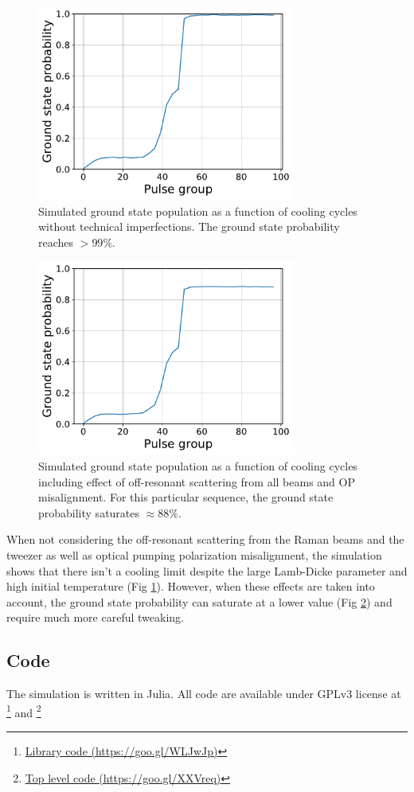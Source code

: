 \documentclass[aps,twocolumn,secnumarabic,balancelastpage,amsmath,amssymb]{revtex4}
\begin{document}
\begin{figure}
  \includegraphics[width=8.5cm]{imgs/simcool_no_scatter.pdf}
  \caption{Simulated ground state population as a function of cooling cycles without
    technical imperfections. The ground state probability reaches $>99\%$. \label{f-no-scatter}}
\end{figure}

\begin{figure}
  \includegraphics[width=8.5cm]{imgs/simcool_real.pdf}
  \caption{Simulated ground state population as a function of cooling cycles including effect of
    off-resonant scattering from all beams and OP misalignment.
    For this particular sequence, the ground state probability saturates $\approx88\%$.
    \label{f-real}}
\end{figure}

When not considering the off-resonant scattering from the Raman beams and the tweezer as well
as optical pumping polarization misalignment, the simulation shows that there isn't a cooling
limit despite the large Lamb-Dicke parameter and high initial temperature (Fig \ref{f-no-scatter}).
However, when these effects are taken into account, the ground state probability can saturate at
a lower value (Fig \ref{f-real}) and require much more careful tweaking.

\subsection{Code}

The simulation is written in Julia\cite{Bezanson2017}.
All code are available under GPLv3 license at
\footnote{\href{https://goo.gl/WLJwJp}{Library code (https://goo.gl/WLJwJp)}} and
\footnote{\href{https://goo.gl/XXVreq}{Top level code (https://goo.gl/XXVreq)}}


\end{document}
